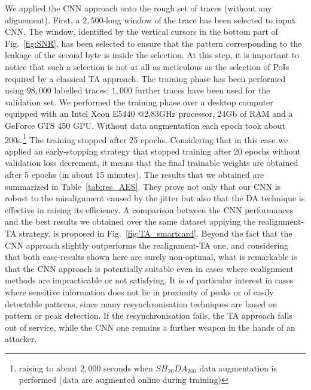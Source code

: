 We applied the CNN approach onto the rough set of traces (without any alignement). First, a $2,500$-long window of the trace has been selected to input CNN. The window, identified by the vertical cursors in the bottom part of Fig.~\ref{fig:SNR}, has been selected to ensure that the pattern corresponding to the leakage of the second byte is inside the selection. At this step, it is important to notice that such a selection is not at all  as meticulous as the selection of PoIs required by a classical TA approach. The training phase has been performed using $98,000$ labelled traces; $1,000$ further traces have been used for the validation set. We performed the training phase over a desktop computer equipped with an Intel Xeon E5440 @2,83GHz processor, 24Gb of RAM and a GeForce GTS 450 GPU. Without data augmentation each epoch took about 200s.\footnote{raising to about $2,000$ seconds when $SH_{20}DA_{200}$ data augmentation is performed (data are augmented online during training)} The training stopped after 25 epochs. Considering that in this case we applied an early-stopping strategy that stopped training after 20 epochs without validation loss decrement, it means that the final trainable weights are obtained after 5 epochs (in about 15 minutes). The results that we obtained are summarized in Table~\ref{tab:res_AES}. They prove not only that our CNN is robust to the misalignment caused by the jitter but also that the DA technique is effective in raising its efficiency. A comparison between the CNN performances and the best results we obtained over the same dataset applying the realignment-TA strategy, is proposed in Fig.~\ref{fig:TA_smartcard}. Beyond the fact that the CNN approach slightly outperforms the realignment-TA one, and considering that both case-results shown here are surely non-optimal, what is remarkable is that the CNN approach is potentially suitable even in cases where realignment methods are impracticable or not satisfying. It is of particular interest in cases where sensitive information does not lie in proximity of peaks or of easily detectable patterns, since many resynchronisation techniques are based on pattern or peak detection. If the resynchronisation fails, the TA approach falls out of service, while the CNN one remains a further weapon in the hands of an attacker.

